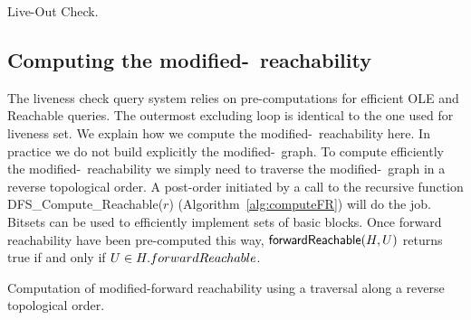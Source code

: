 \begin{algorithm}
  \caption{Live-Out Check.}
  \label{alg:liveoutchk}
\end{algorithm}


\subsection{Computing the modified-\reduced\ reachability}

The liveness check query system relies on pre-computations for efficient \textsf{OLE} and \textsf{{\reduced}Reachable} queries.
The outermost excluding loop is identical to the one used for liveness set.
We explain how we compute the modified-\reduced\ reachability here.
In practice we do not build explicitly the modified-\reduced\ graph.
To compute efficiently the modified-\reduced\ reachability we simply need to traverse the modified-\reduced\ graph in a reverse topological order.
A post-order initiated by a call to the recursive function \textsf{DFS\_Compute\_{\reduced}Reachable}($r$) (Algorithm~\ref{alg:computeFR}) will do the job.
Bitsets can be used to efficiently implement sets of basic blocks.
Once forward reachability have been pre-computed this way, $\textsf{{forward}Reachable}(H,U)$ returns true if and only if $U\in H.{forward}Reachable$.

\begin{algorithm}
\caption{Computation of modified-forward reachability using a traversal along a reverse topological order.}
\label{alg:computeFR}
\end{algorithm}



